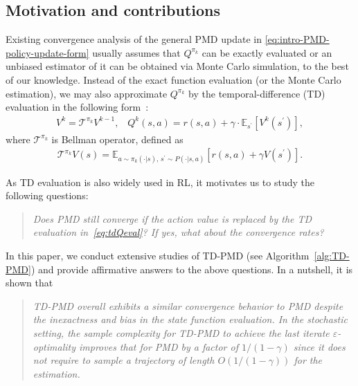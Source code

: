 \documentclass[10pt]{article}
\newcommand{\calT}{\mathcal{T}}
\newcommand{\E}{\mathbb{E}}
\theoremstyle{plain}
\theoremstyle{definition}
\begin{document}
\subsection{Motivation and contributions}




Existing convergence analysis of the general PMD update in \eqref{eq:intro-PMD-policy-update-form}  usually assumes that $Q^{\pi_k}$ can be exactly evaluated or an unbiased estimator of it can be obtained  via Monte Carlo simulation, to the best of our knowledge.  Instead of the exact function evaluation (or the Monte Carlo estimation), we may also approximate $Q^{\pi_k}$ by the temporal-difference (TD) evaluation in the following form~\cite{suttonRL}:
\begin{align}
    V^{k} = \calT^{\pi_k}V^{k-1}, \;\;\; Q^k(s,a) = r(s,a) + \gamma \cdot \E_{s^\prime}[V^k(s^\prime)],\label{eq:tdQeval}
\end{align}
where $\calT^{\pi_k}$ is Bellman operator, defined as
\begin{align}
    \calT^{\pi_k} V(s) = \E_{a\sim\pi_k(\cdot|s), \, s^\prime\sim P(\cdot|s,a)}[r(s,a) + \gamma V(s^\prime)].
    \label{eq:Bellman-operator}
\end{align}

As TD evaluation is also widely used in RL, it motivates us to study the following questions:
\begin{quote}\it Does PMD still converge if the action value is replaced  by the TD evaluation in~\eqref{eq:tdQeval}? If yes, what about the convergence rates?
\end{quote}



In this paper, we conduct extensive studies of TD-PMD (see Algorithm~\ref{alg:TD-PMD}) and provide affirmative answers to the above questions. In a nutshell, it is shown that
\begin{quote}
\it TD-PMD overall exhibits a similar convergence behavior to PMD despite the inexactness and bias in the state function evaluation. In the stochastic setting, the sample complexity for TD-PMD  to achieve the last iterate $\varepsilon$-optimality improves that for PMD by a factor of $1/(1-\gamma)$ since it does not require to sample a trajectory of length $O(1/(1-\gamma))$ for the estimation. 
\end{quote}
\end{document}

